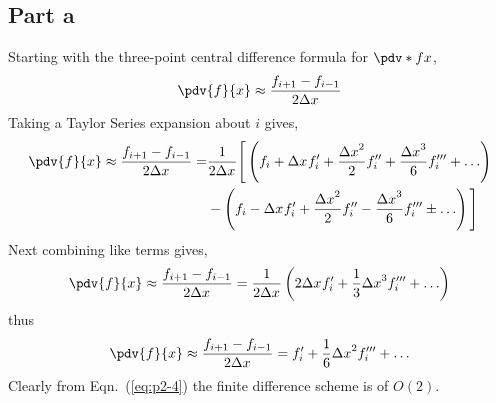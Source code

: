\newcommand{\fii}{f_{i}}
\newcommand{\fipone}{f_{i+1}}
\newcommand{\fiptwo}{f_{i+2}}
\newcommand{\fimone}{f_{i-1}}
\newcommand{\fimtwo}{f_{i-2}}
\newcommand{\Dx}[1]{{\Delta x}^{#1}}
\newcommand{\ac}[1]{a_{#1}}
\newcommand{\Order}[1]{$O\left( #1 \right)$}
\newcommand{\HOTs}{\ldots}

\subsection{Part a}
Starting with the three-point central difference formula for $\pdv*{f}{x}$,
\begin{equation}
    \pdv{f}{x} \approx \frac{\fipone - \fimone}{2\Dx{}}
    \label{eq:p2-1}
\end{equation}
Taking a Taylor Series expansion about $i$ gives,
\begin{equation}
    \begin{split}
        \pdv{f}{x} \approx \frac{\fipone  - \fimone}{ 2 \Dx{} } = & \frac{1}{2\Dx{}}\Bigg[ \left( \fii + \Dx{} \fii^{\prime} + \frac{\Dx{2}}{2}\fii^{\prime \prime} + \frac{\Dx{3}}{6} \fii^{\prime \prime \prime} + \HOTs \right) \\
         & - \left( \fii - \Dx{} \fii^{\prime} + \frac{\Dx{2}}{2}\fii^{\prime \prime} - \frac{\Dx{3}}{6} \fii^{\prime \prime \prime} \pm \HOTs \right) \Bigg]
    \end{split}
    \label{eq:p2-2}
\end{equation}
Next combining like terms gives,
\begin{equation}
    \pdv{f}{x} \approx \frac{\fipone  - \fimone}{ 2 \Dx{} } = \frac{1}{2 \Dx{} } \left(2\Dx{} \fii^{\prime} + \frac{1}{3} \Dx{3} \fii^{\prime \prime \prime} + \HOTs \right)
    \label{eq:p2-3}
\end{equation}
thus 
\begin{equation}
    \pdv{f}{x} \approx \frac{\fipone  - \fimone}{ 2 \Dx{} } = \fii^{\prime} + \frac{1}{6}\Dx{2}\fii^{\prime \prime \prime} + \HOTs
    \label{eq:p2-4}
\end{equation}
Clearly from Eqn.~(\ref{eq:p2-4}) the finite difference scheme is of \Order{2}.
\newcommand{\findif}{\pdv[2]{f}{x} \approx \frac{\fipone - 2\fii + \fimone}{\Dx{2}}}
